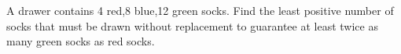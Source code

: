 A drawer contains 4 red,8 blue,12 green socks. Find the least positive number of socks that must be drawn without replacement to guarantee at least twice as many green socks as red socks.
